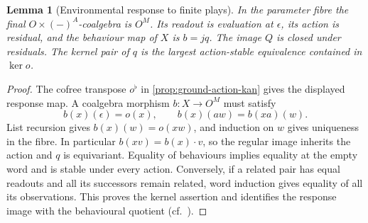 \documentclass[11pt,a4paper]{article}
\newtheorem{lemma}[lemma]{Lemma}
\theoremstyle{definition}
\theoremstyle{remark}\newaliascnt{remark}{theorem}
\numberwithin{equation}{section}
\begin{document}
\begin{lemma}[Environmental response to finite plays]\label{lem:ground-finite-play}
In the parameter fibre the final $O\times(-)^A$-coalgebra is $O^M$. Its readout is evaluation at $\epsilon$, its action is residual, and the behaviour map of $X$ is $b=jq$. The image $Q$ is closed under residuals. The kernel pair of $q$ is the largest action-stable equivalence contained in $\ker o$.
\end{lemma}
\begin{proof}
The cofree transpose \(o^\flat\) in \cref{prop:ground-action-kan} gives the displayed response map. A coalgebra morphism $b:X\to O^M$ must satisfy
\[
 b(x)(\epsilon)=o(x),\qquad b(x)(aw)=b(xa)(w).
\]
List recursion gives $b(x)(w)=o(xw)$, and induction on $w$ gives uniqueness in the fibre. In particular $b(xv)=b(x)\cdot v$, so the regular image inherits the action and $q$ is equivariant. Equality of behaviours implies equality at the empty word and is stable under every action. Conversely, if a related pair has equal readouts and all its successors remain related, word induction gives equality of all its observations. This proves the kernel assertion and identifies the response image with the behavioural quotient (cf.\ \cite{rutten-systems}).
\end{proof}
\end{document}
